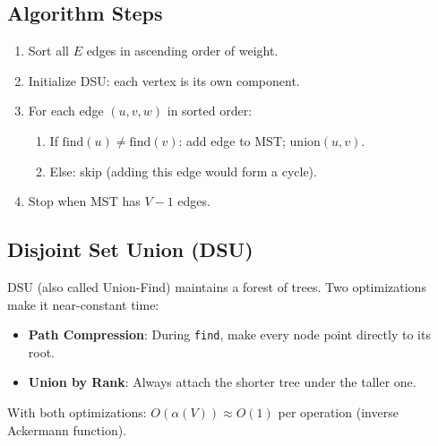 \documentclass[12pt,a4paper]{article}
\begin{document}
\subsection{Algorithm Steps}
\begin{enumerate}
    \item Sort all $E$ edges in ascending order of weight.
    \item Initialize DSU: each vertex is its own component.
    \item For each edge $(u, v, w)$ in sorted order:
    \begin{enumerate}
        \item If $\text{find}(u) \ne \text{find}(v)$: add edge to MST; $\text{union}(u, v)$.
        \item Else: skip (adding this edge would form a cycle).
    \end{enumerate}
    \item Stop when MST has $V - 1$ edges.
\end{enumerate}

\subsection{Disjoint Set Union (DSU)}
DSU (also called Union-Find) maintains a forest of trees. Two optimizations make it near-constant time:
\begin{itemize}
    \item \textbf{Path Compression}: During \texttt{find}, make every node point directly to its root.
    \item \textbf{Union by Rank}: Always attach the shorter tree under the taller one.
\end{itemize}
With both optimizations: $O(\alpha(V)) \approx O(1)$ per operation (inverse Ackermann function).
\end{document}
